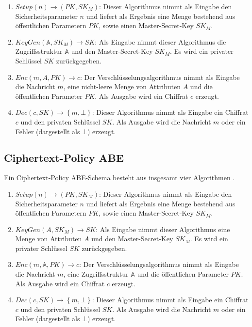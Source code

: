 \documentclass{hsflensburg}
\begin{document}
	\begin{enumerate}
		\item $\textit{Setup}\left(n\right) \to \left(PK, SK_M\right)$: Dieser
			Algorithmus nimmt als Eingabe den Sicherheitsparameter $n$ und liefert als
			Ergebnis eine Menge bestehend aus öffentlichen Parametern $PK$, sowie
			einen Master-Secret-Key $SK_M$.
		\item $\textit{KeyGen}\left(\mathbb{A}, SK_M\right) \to SK$: Als Eingabe
			nimmt dieser Algorithmus die Zu\-griffs\-struktur $\mathbb{A}$ und den
			Master-Secret-Key $SK_M$. Es wird ein privater Schlüssel $SK$
			zurückgegeben.
		\item $Enc\left(m, A, PK\right) \to c$: Der Verschlüsselungsalgorithmus
			nimmt als Eingabe die Nachricht $m$, eine nicht-leere Menge von Attributen
			$A$ und die öffentlichen Parameter $PK$. Als Ausgabe wird ein Chiffrat $c$
			erzeugt.
		\item $Dec\left(c, SK\right) \to \left\{m, \bot\right\}$: Dieser Algorithmus
			nimmt als Eingabe ein Chiffrat $c$ und den privaten Schlüssel $SK$. Als
			Ausgabe wird die Nachricht $m$ oder ein Fehler (dargestellt als $\bot$)
			erzeugt.
	\end{enumerate}

	\subsection{Ciphertext-Policy ABE}
	Ein Ciphertext-Policy ABE-Schema besteht aus insgesamt vier Algorithmen
	\cite{cp-abe}.

	\begin{enumerate}
		\item $\textit{Setup}\left(n\right) \to \left(PK, SK_M\right)$: Dieser
			Algorithmus nimmt als Eingabe den Sicherheitsparameter $n$ und liefert als
			Ergebnis eine Menge bestehend aus öffentlichen Parametern $PK$, sowie
			einen Master-Secret-Key $SK_M$.
		\item $\textit{KeyGen}\left(A, SK_M\right) \to SK$: Als Eingabe
			nimmt dieser Algorithmus eine Menge von Attributen $A$ und den
			Master-Secret-Key $SK_M$. Es wird ein privater Schlüssel $SK$
			zurückgegeben.
		\item $Enc\left(m, \mathbb{A}, PK\right) \to c$: Der
			Verschlüsselungsalgorithmus nimmt als Eingabe die Nachricht $m$, eine
			Zugriffsstruktur $\mathbb{A}$ und die öffentlichen Parameter $PK$.  Als
			Ausgabe wird ein Chiffrat $c$ erzeugt.
		\item $Dec\left(c, SK\right) \to \left\{m, \bot\right\}$: Dieser Algorithmus
			nimmt als Eingabe ein Chiffrat $c$ und den privaten Schlüssel $SK$. Als
			Ausgabe wird die Nachricht $m$ oder ein Fehler (dargestellt als $\bot$)
			erzeugt.
	\end{enumerate}
\end{document}

